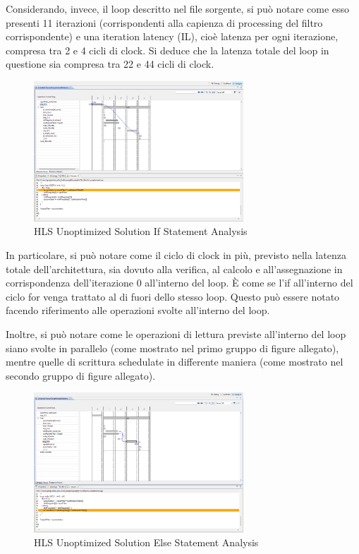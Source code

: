 Considerando, invece, il loop descritto nel file sorgente, si può notare come esso presenti 11 iterazioni (corrispondenti alla capienza di processing del filtro corrispondente) e una iteration latency (IL), cioè latenza per ogni iterazione, compresa tra 2 e 4 cicli di clock. Si deduce che la latenza totale del loop in questione sia compresa tra 22 e 44 cicli di clock.
\begin{figure}[H]
    \centering
    \includegraphics[width=0.7\textwidth]{solutions/unoptimized/cyclesunoptimized.png}
    \caption{HLS Unoptimized Solution If Statement Analysis}
\end{figure}

In particolare, si può notare come il ciclo di clock in più, previsto nella latenza totale dell'architettura, sia dovuto alla verifica, al calcolo e all'assegnazione in corrispondenza dell'iterazione 0 all'interno del loop. È come se l'if all'interno del ciclo for venga trattato al di fuori dello stesso loop. Questo può essere notato facendo riferimento alle operazioni svolte all'interno del loop.

Inoltre, si può notare come le operazioni di lettura previste all'interno del loop siano svolte in parallelo (come mostrato nel primo gruppo di figure allegato), mentre quelle di scrittura schedulate in differente maniera (come mostrato nel secondo gruppo di figure allegato).
\begin{figure}[H]
    \centering
    \includegraphics[width=0.7\textwidth]{solutions/unoptimized/cyclesunoptimized2.png}
    \caption{HLS Unoptimized Solution Else Statement Analysis}
\end{figure}

